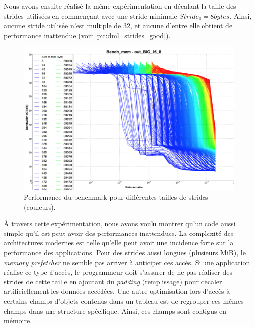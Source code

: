         Nous avons ensuite réalisé la même expérimentation en décalant la taille des strides utilisées en commençant avec une stride minimale $Stride_0 =  8 bytes$. Ainsi, aucune stride utilisée n'est multiple de 32, et aucune d'entre elle obtient de performance inattendue (voir \autoref{pic:dml_strides_good}).
        
        
        \begin{figure}
        \center
        \includegraphics[width=12cm]{images/dml_strides.png}
        \caption{\label{pic:dml_strides_good} Performance du benchmark pour différentes tailles de strides (couleurs).  }
        \end{figure}
        
        À travers cette expérimentation, nous avons voulu montrer qu'un code aussi simple qu'il est peut avoir des performances inattendues. La complexité des architectures modernes est telle qu'elle peut avoir une incidence forte sur la performance des applications. Pour des strides aussi longues (plusieurs MiB), le \textit{memory prefetcher} ne semble pas arriver à anticiper ces accès. Si une application réalise ce type d'accès, le programmeur doit s'assurer de ne pas réaliser des strides de cette taille en ajoutant du \textit{padding} (remplissage) pour décaler artificiellement les données accédées. Une autre optimisation lors d'accès à certains champs d'objets contenus dans un tableau est de regrouper ces mêmes champs dans une structure spécifique. Ainsi, ces champs sont contigus en mémoire. 
        
        
        

